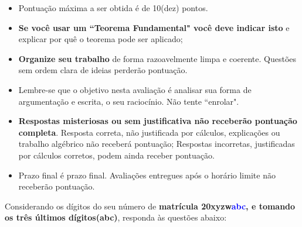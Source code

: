 \documentclass[11pt]{exam}
\begin{document}
\begin{minipage}[t]{3.7in}
  \vspace{0pt}
  \begin{itemize}
    \item Pontuação máxima a ser obtida é de 10(dez) pontos.
    \item \textbf{Se você usar um ``Teorema Fundamental" você deve indicar isto} e explicar por quê o teorema pode ser aplicado;

    \item \textbf{Organize seu trabalho} de forma razoavelmente limpa e coerente. Questões sem ordem clara de ideias perderão pontuação.

    \item Lembre-se que o objetivo nesta avaliação é analisar sua forma de argumentação e escrita, o seu raciocínio. Não tente ``enrolar".

    \item \textbf{Respostas misteriosas ou sem justificativa não receberão pontuação completa}. Resposta correta, não justificada por cálculos, explicações ou trabalho algébrico não receberá pontuação; Respostas incorretas, justificadas por cálculos corretos, podem ainda receber pontuação.

    \item Prazo final é prazo final. Avaliações entregues após o horário limite não receberão pontuação.

  \end{itemize}

\end{minipage}
\hfill
\begin{minipage}[t]{2.3in}
  \vspace{0pt}
  \addpoints
  \gradetable[v]
\end{minipage}

\newpage 

Considerando os dígitos do seu número de \textbf{matrícula 20xyzw\textcolor{blue}{\textbf{abc}}, e tomando os três últimos dígitos(abc)}, responda às questões  abaixo:
\end{document}
